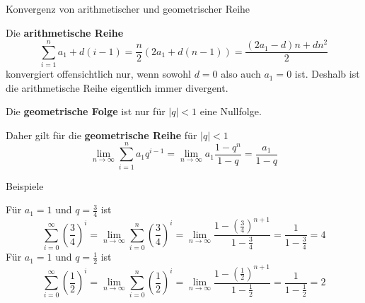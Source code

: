 \begin{frame}{Konvergenz von arithmetischer und geometrischer Reihe}
	\begin{bemerkung}
		Die \textbf{arithmetische Reihe} 
		\[
			\sum_{i=1}^{n} a_{1} + d (i-1) = \frac{n}{2} \left( 2a_{1} + d (n-1) \right) = \frac{(2a_{1}-d)n +d n^{2}}{2}
		\]
		konvergiert offensichtlich nur, wenn sowohl $d=0$ also auch $a_{1}=0$ ist. Deshalb ist die arithmetische Reihe eigentlich immer divergent.
	\end{bemerkung}
	\begin{bemerkung}
		Die \textbf{geometrische Folge} ist nur für $|q|<1$ eine Nullfolge. 
		
		Daher gilt für die \textbf{geometrische Reihe} für $|q|<1$
		\[
		\lim_{n \to \infty} \sum_{i=1}^{n} a_{1} q^{i-1} = \lim_{n \to \infty} a_{1} \frac{1-q^{n}}{1-q} = \frac{a_{1}}{1-q}
		\]
	\end{bemerkung}
\end{frame}

\begin{frame}{Beispiele}
	\begin{example}
		Für $a_{1}=1$ und $q=\frac{3}{4}$ ist
		\[
			\sum_{i=0}^{\infty} \left( \frac{3}{4} \right)^{i} = \lim_{n \to \infty} \sum_{i=0}^{n} \left( \frac{3}{4} \right)^{i} =\lim_{n \to \infty} \frac{1-(\frac{3}{4})^{n+1}}{1-\frac{3}{4}}= \frac{1}{1-\frac{3}{4}} = 4 
		\]
				Für $a_{1}=1$ und $q=\frac{1}{2}$ ist
				\[
				\sum_{i=0}^{\infty} \left( \frac{1}{2} \right)^{i} = \lim_{n \to \infty} \sum_{i=0}^{n} \left( \frac{1}{2} \right)^{i} =\lim_{n \to \infty} \frac{1-(\frac{1}{2})^{n+1}}{1-\frac{1}{2}}= \frac{1}{1-\frac{1}{2}} = 2 
				\]	
	\end{example}
\end{frame}

